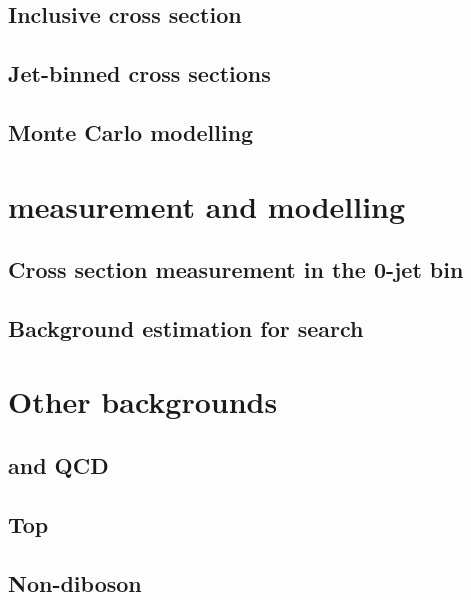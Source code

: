 \documentclass[hyper,linkcolor=blue]{mythesis}
\begin{document}
\begin{mainmatter}
    \section{Inclusive cross section}
      \label{sec:ggf_inc}
      
    \section{Jet-binned cross sections}
      \label{sec:ggf_jetbin}
      
    \section{Monte Carlo modelling}
      \label{sec:ggf_mc}
      

  \chapter{\WW measurement and modelling}
    \label{chap:ww}
    
    \section{Cross section measurement in the 0-jet bin}
      \label{sec:ww_meas}
      
    \section{Background estimation for \HWW search}
      \label{sec:ww_as_bkg}
      

  \chapter{Other backgrounds}
    \label{chap:backgrounds}
    
    \section{\Wjets and QCD}
      \label{sec:wjets}
      
    \section{Top}
      \label{sec:top}
      
    \section{\DY}
      \label{sec:dy}
      
    \section{Non-\WW diboson}
      \label{sec:diboson}
      


\end{mainmatter}
\end{document}
